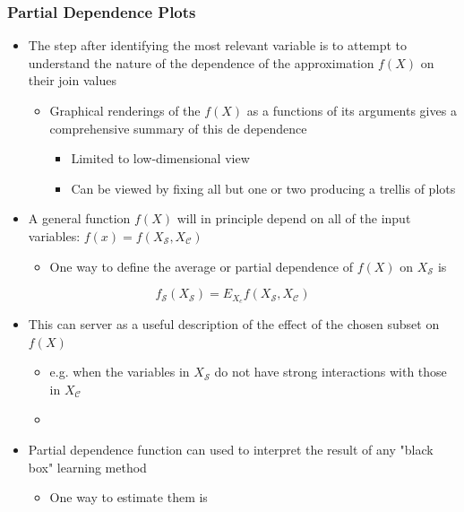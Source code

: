 \documentclass[11pt]{article}
\begin{document}
\subsubsection{Partial Dependence Plots}
\label{sec:org29e5676}
\begin{itemize}
\item The step after identifying the most relevant variable is to attempt to understand the nature of the dependence of the approximation \(f(X)\) on their join values
\begin{itemize}
\item Graphical renderings of the \(f(X)\) as a functions of its arguments gives a comprehensive summary of this de dependence 
\begin{itemize}
\item Limited to low-dimensional view
\item Can be viewed by fixing all but one or two producing a trellis of plots
\end{itemize}
\end{itemize}

\item A general function \(f(X)\) will in principle depend on all of the input variables: \(f(x)=f(X_\mathcal{S}, X_\mathcal{C})\) 
\begin{itemize}
\item One way to define the average or partial dependence of \(f(X)\) on \(X_\mathcal{S}\) is
\end{itemize}
\end{itemize}
\begin{equation}
  f_{\mathcal S} (X_\mathcal S) = E_{X_c}f(X_\mathcal S,X_\mathcal C)
\end{equation}
\begin{itemize}
\item This can server as a useful description of the effect of the chosen subset on \(f(X)\)
\begin{itemize}
\item e.g. when the variables in \(X_\mathcal S\) do not have strong interactions with those in \(X_\mathcal C\)
\item 
\end{itemize}

\item Partial dependence function can used to interpret the result of any "black box" learning method
\begin{itemize}
\item One way to estimate them is
\end{itemize}
\end{itemize}
\end{document}
